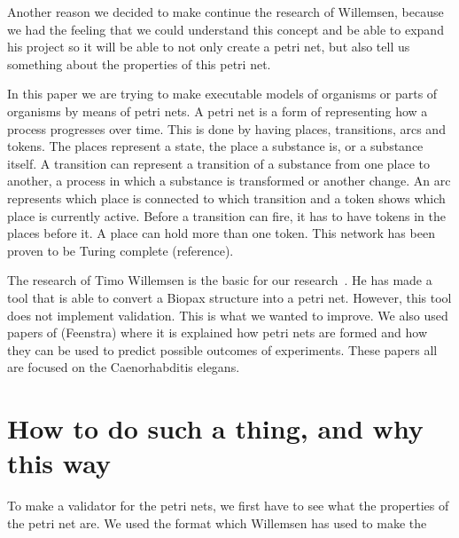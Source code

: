 \documentclass[12pt,a4paper,draft]{article}
\begin{document}
    Another reason we decided to make continue the research of Willemsen, because we had the feeling that we could understand this concept and be able to expand his project so it will be able to not only create a petri net, but also tell us something about the properties of this petri net.
    
    In this paper we are trying to make executable models of organisms or parts of organisms by means of petri nets. A petri net is a form of representing how a process progresses over time. This is done by having places, transitions, arcs and tokens. The places represent a state, the place a substance is, or a substance itself. A transition can represent a transition of a substance from one place to another, a process in which a substance is transformed or another change. An arc represents which place is connected to which transition and a token shows which place is currently active. Before a transition can fire, it has to have tokens in the places before it. A place can hold more than one token. This network has been proven to be Turing complete (reference).
    
    The research of Timo Willemsen is the basic for our research~\cite{Willemsen2013}. He has made a tool that is able to convert a Biopax structure into a petri net. However, this tool does not implement validation. This is what we wanted to improve. We also used papers of
    (Feenstra) where it is explained how petri nets are formed and how they can be used to predict possible outcomes of experiments. These papers all are focused on the Caenorhabditis elegans.
    
\section{How to do such a thing, and why this way}\label{sec:methods}

    To make a validator for the petri nets, we first have to see what the properties of the petri net are. We used the format which Willemsen has used to make the 
    
    
    
\end{document}

